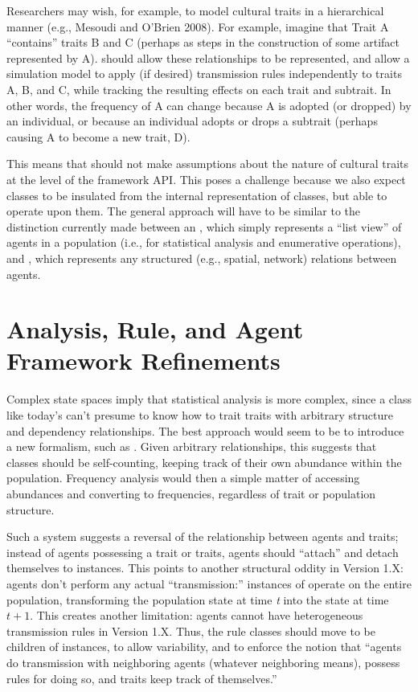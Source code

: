 \documentclass[pdftex,letterpaper,rmp,groupedaddress,floatfix]{revtex4}
\begin{document}
Researchers may wish, for example, to model cultural traits in a hierarchical manner (e.g., Mesoudi and O'Brien 2008).  For example, imagine that Trait A ``contains'' traits B and C (perhaps as steps in the construction of some artifact represented by A).  \tl should allow these relationships to be represented, and allow a simulation model to apply (if desired) transmission rules independently to traits A, B, and C, while tracking the resulting effects on each trait and subtrait.  In other words, the frequency of A can change because A is adopted (or dropped) by an individual, or because an individual adopts or drops a subtrait (perhaps causing A to become a new trait, D).  

This means that \tl should not make assumptions about the nature of cultural traits at the level of the framework API.  This poses a challenge because we also expect  classes to be insulated from the internal representation of  classes, but able to operate upon them.  The general approach will have to be similar to the distinction currently made between an , which simply represents a ``list view'' of agents in a population (i.e., for statistical analysis and enumerative operations), and , which represents any structured (e.g., spatial, network) relations between agents.  

\section{Analysis, Rule, and Agent Framework Refinements}

Complex state spaces imply that statistical analysis is more complex, since a class like today's  can't presume to know how to trait traits with arbitrary structure and dependency relationships.   The best approach would seem to be to introduce a new formalism, such as .  Given arbitrary relationships, this suggests that  classes should be self-counting, keeping track of their own abundance within the population.  Frequency analysis would then a simple matter of accessing abundances and converting to frequencies, regardless of trait or population structure.  

Such a system suggests a reversal of the relationship between agents and traits; instead of agents possessing a trait or traits, agents should ``attach'' and detach themselves to  instances.  This points to another structural oddity in \tl Version 1.X:  agents don't perform any actual ``transmission:''  instances of  operate on the entire population, transforming the population state at time \emph{t} into the state at time \emph{$t+1$}.  This creates another limitation:  agents cannot have heterogeneous transmission rules in \tl Version 1.X.  Thus, the rule classes should move to be children of  instances, to allow variability, and to enforce the notion that ``agents do transmission with neighboring agents (whatever neighboring means), possess rules for doing so, and traits keep track of themselves.''  
\end{document}
